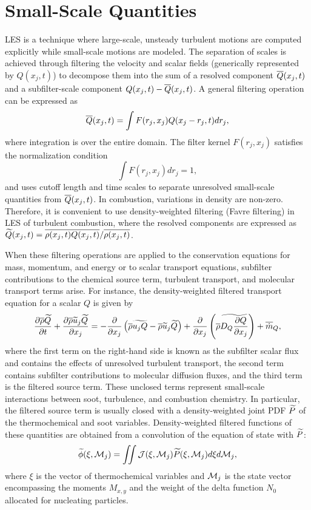 \section{Small-Scale Quantities}
\label{sec:lesmodels:presumedpdf}

LES is a technique where large-scale, unsteady turbulent motions are computed explicitly while small-scale motions are modeled. The separation of scales is achieved through filtering the velocity and scalar fields (generically represented by $Q(x_j,t)$) to decompose them into the sum of a resolved component $\mean{Q}(x_j,t)$ and a subfilter-scale component $Q(x_j,t)-\mean{Q}(x_j,t)$. A general filtering operation can be expressed as
\begin{equation}\label{eq:lesmodels:presumedpdf:filter}
  \mean{Q}(x_j,t) = \int F(r_j,x_j)Q(x_j - r_j, t)dr_j,
\end{equation}
where integration is over the entire domain. The filter kernel $F(r_j,x_j)$ satisfies the normalization condition
\begin{equation}\label{eq:lesmodels:presumedpdf:kernel}
  \int F(r_j,x_j)dr_j = 1,
\end{equation}
and uses cutoff length and time scales to separate unresolved small-scale quantities from $\mean{Q}(x_j,t)$. In combustion, variations in density are non-zero. Therefore, it is convenient to use density-weighted filtering (Favre filtering) in LES of turbulent combustion, where the resolved components are expressed as $\tf{Q}(x_j,t) = \mean{\rho(x_j,t)Q(x_j,t)}/\mean{\rho(x_j,t)}$.

When these filtering operations are applied to the conservation equations for mass, momentum, and energy or to scalar transport equations, subfilter contributions to the chemical source term, turbulent transport, and molecular transport terms arise. For instance, the density-weighted filtered transport equation for a scalar $Q$ is given by
\begin{equation}\label{eq:lesmodels:presumedpdf:scalar}
  \ftrder{\tf{Q}} = -\dsff[\tf{Q}]{\tf{u_j Q}} + \pder[]{x_j}\left( \mean{\rho}\tf{D_Q\pder[Q]{x_j}} \right) + \fst[m]{Q},
\end{equation}
where the first term on the right-hand side is known as the subfilter scalar flux and contains the effects of unresolved turbulent transport, the second term contains subfilter contributions to molecular diffusion fluxes, and the third term is the filtered source term. These unclosed terms represent small-scale interactions between soot, turbulence, and combustion chemistry. In particular, the filtered source term is usually closed with a density-weighted joint PDF $\tf{P}$ of the thermochemical and soot variables. Density-weighted filtered functions of these quantities are obtained from a convolution of the equation of state with $\tf{P}$:
\begin{equation}\label{eq:lesmodels:presumedpdf:filteredfuncs}
  \tf{\phi}(\xi,\mc{M}_j) = \iint \mc{J}(\xi,\mc{M}_j)\tf{P}(\xi,\mc{M}_j) d\xi d\mc{M}_j,
\end{equation}
where $\xi$ is the vector of thermochemical variables and $\mc{M}_j$ is the state vector encompassing the moments $M_{x,y}$ and the weight of the delta function $N_0$ allocated for nucleating particles.

